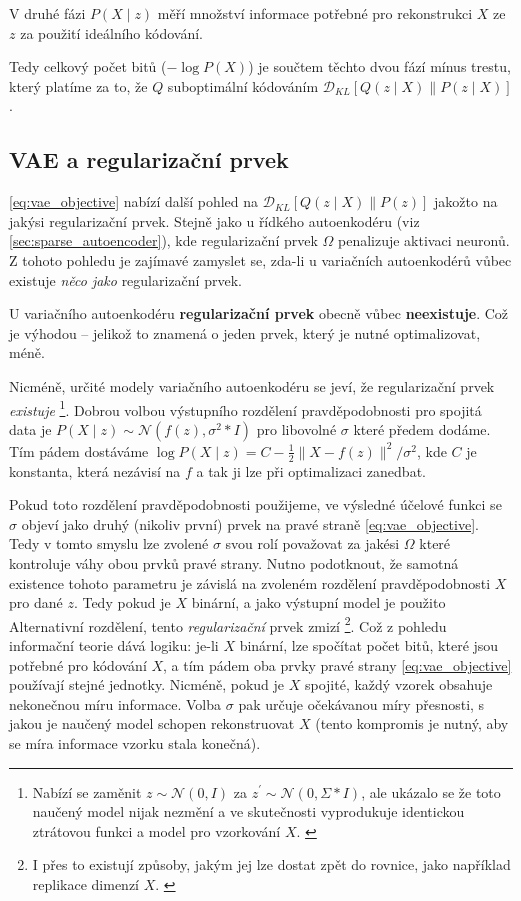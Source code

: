 V druhé fázi $P(X\mid z)$ měří množství informace potřebné pro rekonstrukci $X$ ze $z$ za použití ideálního kódování.

Tedy celkový počet bitů ($- \log P(X)$) je součtem těchto dvou fází mínus trestu, který platíme za to, že $Q$ suboptimální kódováním $\mathcal{D}_{KL}\left[ Q(z\mid X) \parallel P(z\mid X) \right]$. 


\subsection{VAE a regularizační prvek}
\autoref{eq:vae_objective} nabízí další pohled na  $\mathcal{D}_{KL}\left[ Q(z\mid X) \parallel P(z) \right]$ jakožto na jakýsi regularizační prvek.
Stejně jako u řídkého autoenkodéru (viz \autoref{sec:sparse_autoencoder}), kde regularizační prvek $\Omega$ penalizuje aktivaci neuronů.
Z tohoto pohledu je zajímavé zamyslet se, zda-li u variačních autoenkodérů vůbec existuje \emph{něco jako} regularizační prvek.

U variačního autoenkodéru \textbf{regularizační prvek} obecně vůbec \textbf{neexistuje}.
Což je výhodou – jelikož to znamená o jeden prvek, který je nutné optimalizovat, méně.

Nicméně, určité modely variačního autoenkodéru se jeví, že regularizační prvek \emph{existuje}
\footnote{Nabízí se zaměnit $z \sim \mathcal{N}(0, I)$ za $z^\prime \sim \mathcal{N}(0, \Sigma * I)$, ale ukázalo se že toto naučený model nijak nezmění a ve skutečnosti vyprodukuje identickou ztrátovou funkci a model pro vzorkování $X$. \cite{Doersch2021}}.
Dobrou volbou výstupního rozdělení pravděpodobnosti pro spojitá data je $P(X\mid z) \sim \mathcal{N}(f(z), \sigma^2 * I)$ pro libovolné $\sigma$ které předem dodáme.
Tím pádem dostáváme $\log P(X\mid z) = C - \frac{1}{2} \| X - f(z) \|^2 / \sigma^2$, kde $C$ je konstanta, která nezávisí na $f$ a tak ji lze při optimalizaci zanedbat.

Pokud toto rozdělení pravděpodobnosti použijeme, ve výsledné účelové funkci se $\sigma$ objeví jako druhý (nikoliv první) prvek na pravé straně \autoref{eq:vae_objective}.
Tedy v tomto smyslu lze zvolené $\sigma$ svou rolí považovat za jakési $\Omega$ které kontroluje váhy obou prvků pravé strany.
Nutno podotknout, že samotná existence tohoto parametru je závislá na zvoleném rozdělení pravděpodobnosti $X$ pro dané $z$.
Tedy pokud je $X$ binární, a jako výstupní model je použito Alternativní rozdělení, tento \emph{regularizační} prvek zmizí 
\footnote{I přes to existují způsoby, jakým jej lze dostat zpět do rovnice, jako například replikace dimenzí $X$. \cite{Doersch2021}}.
Což z pohledu informační teorie dává logiku: je-li $X$ binární, lze spočítat počet bitů, které jsou potřebné pro kódování $X$, a tím pádem oba prvky pravé strany \autoref{eq:vae_objective} používají stejné jednotky.
Nicméně, pokud je $X$ spojité, každý vzorek obsahuje nekonečnou míru informace. Volba $\sigma$ pak určuje očekávanou míry přesnosti, s jakou je naučený model schopen rekonstruovat $X$ (tento kompromis je nutný, aby se míra informace vzorku stala konečná).
